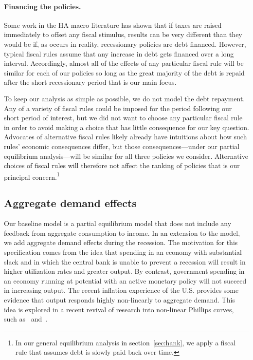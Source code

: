 \documentclass[\PathToRoot/\ProjectName]{subfiles}
\begin{document}
\paragraph{Financing the policies.} Some work in the HA macro literature has shown that if taxes are raised immediately to offset any fiscal stimulus, results can be very different than they would be if, as occurs in reality, recessionary policies are debt financed.
However, typical fiscal rules assume that any increase in debt gets financed over a long interval.
Accordingly, almost all of the effects of any particular fiscal rule will be  similar for each of our policies so long as the great majority of the debt is repaid after the short recessionary period that is our main focus.

To keep our analysis as simple as possible, we do not model the debt repayment.
Any of a variety of fiscal rules could be imposed for the period following our short period of interest, but we did not want to choose any particular fiscal rule in order to avoid making a choice that has little consequence for our key question.
Advocates of alternative fiscal rules likely already have intuitions about how such rules' economic consequences differ, but those consequences---under our partial equilibrium analysis---will be similar for all three policies we consider.
Alternative choices of fiscal rules will therefore not affect the ranking of policies that is our principal concern.\footnote{In our general equilibrium analysis in section~\ref{sec:hank}, we apply a fiscal rule that assumes debt is slowly paid back over time.}

\subsection{Aggregate demand effects}\whenintegrated{\label{aggregate-demand-effects}}
\whenintegrated{\label{sec:ADeffects}} 

Our baseline model is a partial equilibrium model that does not include any feedback from aggregate consumption to income.
In an extension to the model, we add aggregate demand effects during the recession.
The motivation for this specification comes from the idea that spending in an economy with substantial slack and in which the central bank is unable to prevent a recession will result in higher utilization rates and greater output.
By contrast, government spending in an economy running at potential with an active monetary policy will not succeed in increasing output.
The recent inflation experience of the U.S.
provides some evidence that output responds highly non-linearly to aggregate demand.
This idea is explored in a recent revival of research into non-linear Phillips curves, such as~\cite{benigno2023baaack} and~\cite{blanco2024nonlinear}.
\end{document}
